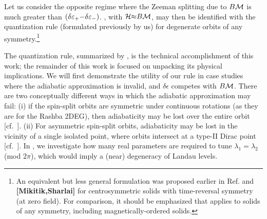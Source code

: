 \documentclass[aps, prb, showpacs, twocolumn, notitlepage, superscriptaddress]{revtex4-1}
\begin{document}
 Let us consider the opposite regime where the Zeeman splitting due to $B{\cal M}$ is much greater than $(\delta \varepsilon_+{-}\delta\varepsilon_-)$. , with ${\cal H}{\approx}B{\cal M}$, may then be identified with the quantization rule (formulated previously by us\cite{topoferm,100p}) for degenerate orbits of any symmetry.\footnote{An equivalent but less general formulation was proposed earlier in Ref.  and \textbf{[Mikitik,Sharlai]} for centrosymmetric solids with time-reversal symmetry (at zero field). For comparison, it should be emphasized that  applies to solids of any symmetry, including magnetically-ordered solids.}	   











The quantization rule, summarized by , is the technical accomplishment of this work; the remainder of this work is focused on unpacking its physical implications. We will first demonstrate the utility of our rule in case studies where the adiabatic approximation is invalid, and $\delta \epsilon$ competes with $B{\cal M}$. There are two conceptually different ways in which the adiabatic approximation may fail: (i) if the spin-split orbits are  symmetric under continuous rotations (as they are for the Rashba 2DEG), then adiabaticity may be lost over the entire orbit [cf.\ ]. (ii) For asymmetric spin-split orbits, adiabaticity may be lost in the vicinity of a single isolated point, where orbits intersect at a type-II Dirac point [cf.\ ]. 
In , we investigate how many real parameters are required to tune $\lambda_1{=}\lambda_2$ (mod $2\pi$), which would imply a (near) degeneracy of Landau levels.  
\end{document}
